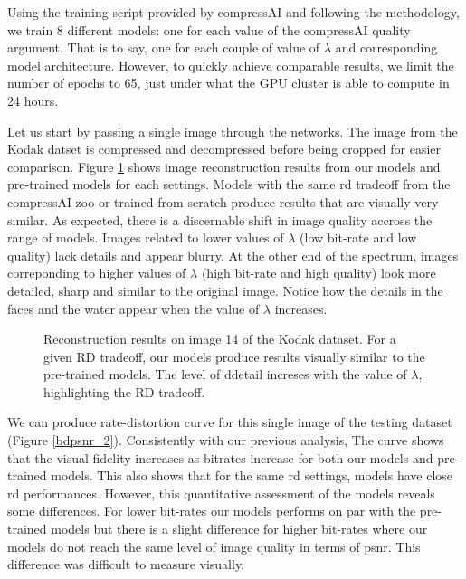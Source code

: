 Using the training script provided by compressAI and following the methodology, we train 8 different models: one for each value of the compressAI \textsf{quality} argument. That is to say, one for each couple of value of \(\lambda\) and corresponding model architecture. However, to quickly achieve comparable results, we limit the number of epochs to 65, just under what the GPU cluster is able to compute in 24 hours.

Let us start by passing a single image through the networks. The image from the Kodak datset is compressed and decompressed before being cropped for easier comparison. Figure \ref{bdpsnr_1} shows image reconstruction results from our models and pre-trained models for each settings. Models with the same \acrshort{rd} tradeoff from the compressAI zoo or trained from scratch produce results that are visually very similar. As expected, there is a discernable shift in image quality accross the range of models. Images related to lower values of \(\lambda\) (low bit-rate and low quality) lack details and appear blurry. At the other end of the spectrum, images correponding to higher values of \(\lambda\) (high bit-rate and high quality) look more detailed, sharp and similar to the original image. Notice how the details in the faces and the water appear when the value of \(\lambda\) increases.

\begin{figure}[H]
    \centering
    \caption[Reconstruction results on image 14 of the Kodak dataset.]{Reconstruction results on image 14 of the Kodak dataset. For a given \acrshort{RD} tradeoff, our models produce results visually similar to the pre-trained models. The level of ddetail increses with the value of \(\lambda\), highlighting the \acrshort{RD} tradeoff.}
    \label{bdpsnr_1}
\end{figure}

We can produce rate-distortion curve for this single image of the testing dataset (Figure \ref{bdpsnr_2}). Consistently with our previous analysis, The curve shows that the visual fidelity increases as bitrates increase for both our models and pre-trained models. This also shows that for the same \acrshort{rd} settings, models have close \acrshort{rd} performances. However, this quantitative assessment of the models reveals some differences. For lower bit-rates our models performs on par with the pre-trained models but there is a slight difference for higher bit-rates where our models do not reach the same level of image quality in terms of \acrshort{psnr}. This difference was difficult to measure visually.

